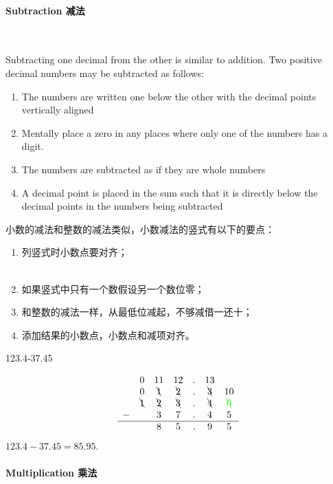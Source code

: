 \paragraph{Subtraction 减法} \ \ \\

\begin{paracol}{2}
Subtracting one decimal from the other is similar to addition. Two positive decimal numbers may be subtracted as follows:
\begin{enumerate}
\item The numbers are written one below the other with the decimal points vertically aligned
\item Mentally place a zero in any places where only one of the numbers has a digit.
\item The numbers are subtracted as if they are whole numbers
\item A decimal point is placed in the sum such that it is directly below the decimal points in the numbers being subtracted
\end{enumerate}
\switchcolumn[1]
小数的减法和整数的减法类似，小数减法的竖式有以下的要点：\\ 
\begin{enumerate}
\item 列竖式时小数点要对齐；\\ \\ 
\item 如果竖式中只有一个数假设另一个数位零；
\item 和整数的减法一样，从最低位减起，不够减借一还十；
\item 添加结果的小数点，小数点和减项对齐。
\end{enumerate}
\end{paracol}

\begin{example}
123.4-37.45
\end{example}
\begin{solution}
$$
\begin{array}{lcccccc}
&0&11&12&.&13&\\
&0&\bcancel{1}&\bcancel{2}&.&\bcancel{3}&10\\
&\bcancel{1}&\bcancel{2}&\bcancel{3}&.&\bcancel{4}&{\color{green} \bcancel{0}}\\
-&&3&7&.&4&5\\
\hline
&&8&5&.&9&5
\end{array}
$$
$123.4-37.45 = 85.95$.
\end{solution}

\paragraph{Multiplication 乘法} \ \ \\

